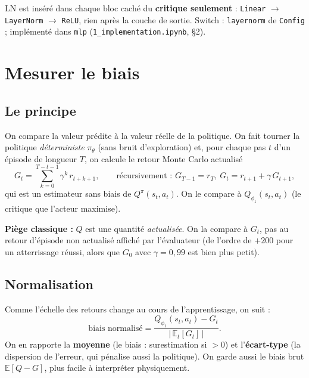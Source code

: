 \documentclass[11pt,a4paper]{article}
\newcommand{\E}{\mathbb{E}}
\newcommand{\code}[1]{\texttt{#1}}
\begin{document}
\begin{codebox}
LN est inséré dans chaque bloc caché du \textbf{critique seulement} :
\code{Linear} $\to$ \code{LayerNorm} $\to$ \code{ReLU}, rien après la couche de sortie.
Switch : \code{layernorm} de \code{Config} ; implémenté dans \code{mlp}
(\code{1\_implementation.ipynb}, §2).
\end{codebox}

\section{Mesurer le biais}

\subsection{Le principe}
On compare la valeur prédite à la valeur réelle de la politique. On fait tourner la politique
\emph{déterministe} $\pi_\theta$ (sans bruit d'exploration) et, pour chaque pas $t$ d'un épisode de
longueur $T$, on calcule le retour Monte Carlo actualisé
\begin{equation}
  G_t = \sum_{k=0}^{T-t-1}\gamma^k\, r_{t+k+1}, \qquad\text{récursivement : } G_{T-1} = r_T,\
  G_t = r_{t+1} + \gamma\, G_{t+1},
\end{equation}
qui est un estimateur sans biais de $Q^{\pi}(s_t,a_t)$. On le compare à $Q_{\phi_1}(s_t,a_t)$ (le
critique que l'acteur maximise).

\textbf{Piège classique :} $Q$ est une quantité \emph{actualisée}. On la compare à $G_t$, pas au
retour d'épisode non actualisé affiché par l'évaluateur (de l'ordre de $+200$ pour un atterrissage
réussi, alors que $G_0$ avec $\gamma=0{,}99$ est bien plus petit).

\subsection{Normalisation}
Comme l'échelle des retours change au cours de l'apprentissage, on suit \citet{chen2021redq} :
\begin{equation}
  \text{biais normalisé} = \frac{Q_{\phi_1}(s_t,a_t) - G_t}{\big|\,\E_{t}[G_t]\,\big|}.
\end{equation}
On en rapporte la \textbf{moyenne} (le biais : surestimation si $>0$) et l'\textbf{écart-type}
(la dispersion de l'erreur, qui pénalise aussi la politique). On garde aussi le biais brut
$\E[Q - G]$, plus facile à interpréter physiquement.
\end{document}
